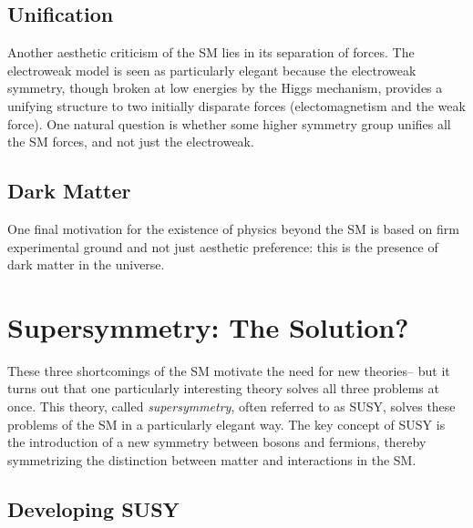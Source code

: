 \subsection{Unification}

Another aesthetic criticism of the SM lies in its separation of forces. The electroweak model is seen as particularly elegant because the electroweak symmetry, though broken at low energies by the Higgs mechanism, provides a unifying structure to two initially disparate forces (electomagnetism and the weak force). One natural question is whether some higher symmetry group unifies all the SM forces, and not just the electroweak. 


\subsection{Dark Matter}

One final motivation for the existence of physics beyond the SM is based on firm experimental ground and not just aesthetic preference: this is the presence of dark matter in the universe. 

\section{Supersymmetry: The Solution?}

These three shortcomings of the SM motivate the need for new theories-- but it turns out that one particularly interesting theory solves all three problems at once. This theory, called \textit{supersymmetry}, often referred to as SUSY, solves these problems of the SM in a particularly elegant way. The key concept of SUSY is the introduction of a new symmetry between bosons and fermions, thereby symmetrizing the distinction between matter and interactions in the SM.

\subsection{Developing SUSY} 


